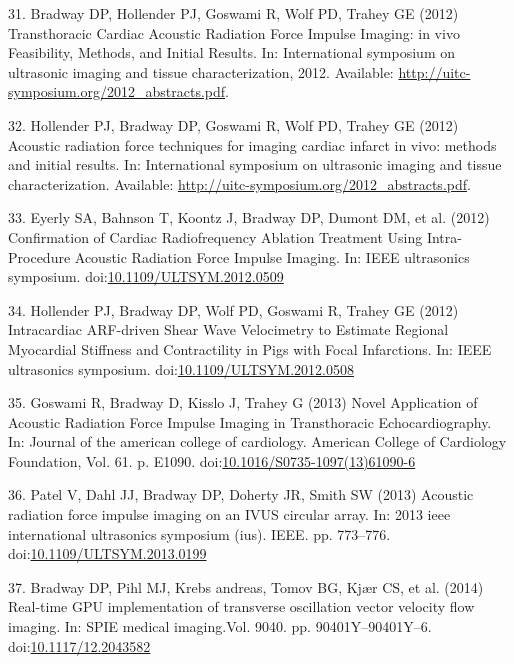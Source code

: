 \documentclass[
]{article}
\newenvironment{cslreferences}%
  {}%
  {\par}
\begin{document}
\begin{cslreferences}
\leavevmode\hypertarget{ref-Bradway2012b}{}%
31. Bradway DP, Hollender PJ, Goswami R, Wolf PD, Trahey GE (2012)
Transthoracic Cardiac Acoustic Radiation Force Impulse Imaging: in vivo
Feasibility, Methods, and Initial Results. In: International symposium
on ultrasonic imaging and tissue characterization, 2012. Available:
\url{http://uitc-symposium.org/2012_abstracts.pdf}.

\leavevmode\hypertarget{ref-Hollender2012}{}%
32. Hollender PJ, Bradway DP, Goswami R, Wolf PD, Trahey GE (2012)
Acoustic radiation force techniques for imaging cardiac infarct in vivo:
methods and initial results. In: International symposium on ultrasonic
imaging and tissue characterization. Available:
\url{http://uitc-symposium.org/2012_abstracts.pdf}.

\leavevmode\hypertarget{ref-Eyerly2012b}{}%
33. Eyerly SA, Bahnson T, Koontz J, Bradway DP, Dumont DM, et al. (2012)
Confirmation of Cardiac Radiofrequency Ablation Treatment Using
Intra-Procedure Acoustic Radiation Force Impulse Imaging. In: IEEE
ultrasonics symposium.
doi:\href{https://doi.org/10.1109/ULTSYM.2012.0509}{10.1109/ULTSYM.2012.0509}

\leavevmode\hypertarget{ref-Hollender2012b}{}%
34. Hollender PJ, Bradway DP, Wolf PD, Goswami R, Trahey GE (2012)
Intracardiac ARF-driven Shear Wave Velocimetry to Estimate Regional
Myocardial Stiffness and Contractility in Pigs with Focal Infarctions.
In: IEEE ultrasonics symposium.
doi:\href{https://doi.org/10.1109/ULTSYM.2012.0508}{10.1109/ULTSYM.2012.0508}

\leavevmode\hypertarget{ref-Goswami2013}{}%
35. Goswami R, Bradway D, Kisslo J, Trahey G (2013) Novel Application of
Acoustic Radiation Force Impulse Imaging in Transthoracic
Echocardiography. In: Journal of the american college of cardiology.
American College of Cardiology Foundation, Vol. 61. p. E1090.
doi:\href{https://doi.org/10.1016/S0735-1097(13)61090-6}{10.1016/S0735-1097(13)61090-6}

\leavevmode\hypertarget{ref-Patel2013}{}%
36. Patel V, Dahl JJ, Bradway DP, Doherty JR, Smith SW (2013) Acoustic
radiation force impulse imaging on an IVUS circular array. In: 2013 ieee
international ultrasonics symposium (ius). IEEE. pp. 773--776.
doi:\href{https://doi.org/10.1109/ULTSYM.2013.0199}{10.1109/ULTSYM.2013.0199}

\leavevmode\hypertarget{ref-Bradway2014}{}%
37. Bradway DP, Pihl MJ, Krebs andreas, Tomov BG, Kjær CS, et al. (2014)
Real-time GPU implementation of transverse oscillation vector velocity
flow imaging. In: SPIE medical imaging.Vol. 9040. pp. 90401Y--90401Y--6.
doi:\href{https://doi.org/10.1117/12.2043582}{10.1117/12.2043582}


\end{cslreferences}
\end{document}
